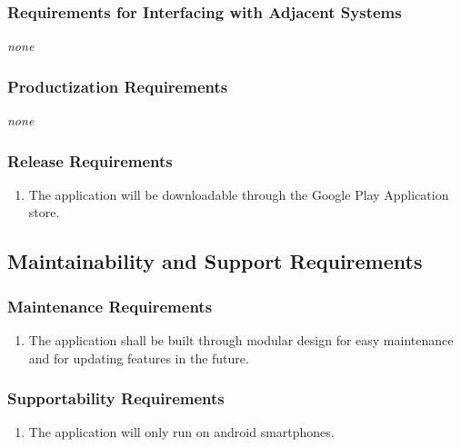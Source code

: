 \documentclass[12pt, titlepage]{article}
\begin{document}
\subsubsection{Requirements for Interfacing with Adjacent Systems}
\label{ssub:requirements_for_interfacing_with_adjacent_systems}
\emph{none}

\subsubsection{Productization Requirements}
\label{ssub:productization_requirements}
\emph{none}

\subsubsection{Release Requirements}
\label{ssub:release_requirements}
\begin{enumerate}[{OE}3. ]
	\item The application will be downloadable through the Google Play Application store.
\end{enumerate}


\subsection{Maintainability and Support Requirements}
\label{sub:maintainability_and_support_requirements}

\subsubsection{Maintenance Requirements}
\label{ssub:maintenance_requirements}
\begin{enumerate}[{MS}1. ]
	\item The application shall be built through modular design for easy maintenance and for updating features in the future.
\end{enumerate}

\subsubsection{Supportability Requirements}
\label{ssub:supportability_requirements}
\begin{enumerate}[{MS}2. ]
	\item The application will only run on android smartphones.
\end{enumerate}
\end{document}
